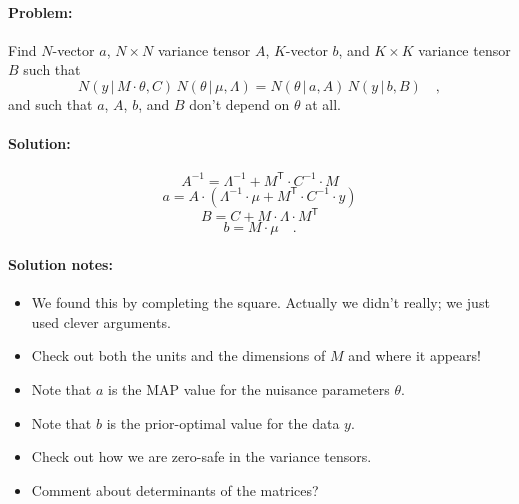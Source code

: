 \documentclass[12pt, letterpaper]{article}
\newcommand{\given}{\,|\,}
\newcommand{\T}{^{\!\mathsf{T}}}
\newcommand{\inv}{^{-1}}
\begin{document}
\paragraph{Problem:}
Find $N$-vector $a$, $N\times N$ variance tensor $A$, $K$-vector $b$,
and $K\times K$ variance tensor $B$ such that
\begin{equation}
N(y\given M\cdot\theta, C)\,N(\theta\given\mu, \Lambda)
 = N(\theta\given a, A)\,N(y\given b, B) \quad ,
\end{equation}
and such that $a$, $A$, $b$, and $B$ don't depend on $\theta$ at all.

\paragraph{Solution:}
\begin{equation}
A\inv = \Lambda\inv + M\T \cdot C\inv \cdot M
\end{equation}
\begin{equation}
a = A \cdot (\Lambda\inv \cdot \mu + M\T \cdot C\inv \cdot y)
\end{equation}
\begin{equation}
B = C + M \cdot \Lambda \cdot M\T
\end{equation}
\begin{equation}
b = M \cdot \mu
\quad .
\end{equation}

\paragraph{Solution notes:}
\begin{itemize}
\item
We found this by completing the square. Actually we didn't really; we just
used clever arguments.
\item
Check out both the units and the dimensions of $M$ and where it appears!
\item
Note that $a$ is the MAP value for the nuisance parameters $\theta$.
\item
Note that $b$ is the prior-optimal value for the data $y$.
\item
Check out how we are zero-safe in the variance tensors.
\item
Comment about determinants of the matrices?
\end{itemize}
\end{document}
